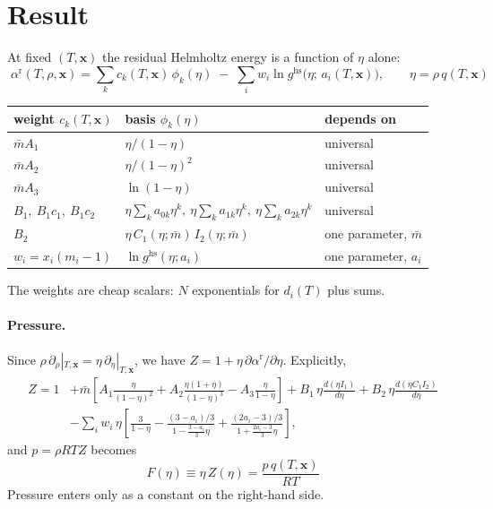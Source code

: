 \documentclass[11pt]{article}
\newcommand{\mbar}{\bar m}
\begin{document}
\section{Result}

At fixed $(T,\mathbf x)$ the residual Helmholtz energy is a function of $\eta$ alone:
\begin{equation}
\boxed{\;
\alpha^{\mathrm r}(T,\rho,\mathbf x) = \sum_k c_k(T,\mathbf x)\,\phi_k(\eta)
\;-\; \sum_i w_i \ln g^{\mathrm{hs}}\!\bigl(\eta;\,a_i(T,\mathbf x)\bigr),
\qquad \eta = \rho\, q(T,\mathbf x)\;}
\end{equation}

\begin{center}
\begin{tabular}{@{}lll@{}}
\toprule
weight $c_k(T,\mathbf x)$ & basis $\phi_k(\eta)$ & depends on \\
\midrule
$\mbar A_1$ & $\eta/(1-\eta)$ & universal \\
$\mbar A_2$ & $\eta/(1-\eta)^2$ & universal \\
$\mbar A_3$ & $\ln(1-\eta)$ & universal \\
$B_1,\ B_1c_1,\ B_1c_2$ & $\eta\sum_k a_{0k}\eta^k,\ \eta\sum_k a_{1k}\eta^k,\ \eta\sum_k a_{2k}\eta^k$ & universal \\
$B_2$ & $\eta\,C_1(\eta;\mbar)\,I_2(\eta;\mbar)$ & one parameter, $\mbar$ \\
$w_i = x_i(m_i-1)$ & $\ln g^{\mathrm{hs}}(\eta;a_i)$ & one parameter, $a_i$ \\
\bottomrule
\end{tabular}
\end{center}

The weights are cheap scalars: $N$ exponentials for $d_i(T)$ plus sums.

\paragraph{Pressure.}
Since $\rho\,\partial_\rho|_{T,\mathbf x} = \eta\,\partial_\eta|_{T,\mathbf x}$, we have
$Z = 1 + \eta\,\partial\alpha^{\mathrm r}/\partial\eta$. Explicitly,
\begin{align}
Z = 1 &+ \mbar\left[A_1\frac{\eta}{(1-\eta)^2} + A_2\frac{\eta(1+\eta)}{(1-\eta)^3} - A_3\frac{\eta}{1-\eta}\right]
+ B_1\,\eta\frac{d(\eta I_1)}{d\eta} + B_2\,\eta\frac{d(\eta C_1 I_2)}{d\eta} \nonumber\\
&- \sum_i w_i\,\eta\left[\frac{3}{1-\eta} - \frac{(3-a_i)/3}{1-\tfrac{3-a_i}{3}\eta} + \frac{(2a_i-3)/3}{1+\tfrac{2a_i-3}{3}\eta}\right],
\end{align}
and $p = \rho RT Z$ becomes
\begin{equation}
\boxed{\;F(\eta) \equiv \eta\,Z(\eta) = \frac{p\,q(T,\mathbf x)}{RT}\;}
\label{eq:target}
\end{equation}
Pressure enters only as a constant on the right-hand side.
\end{document}
